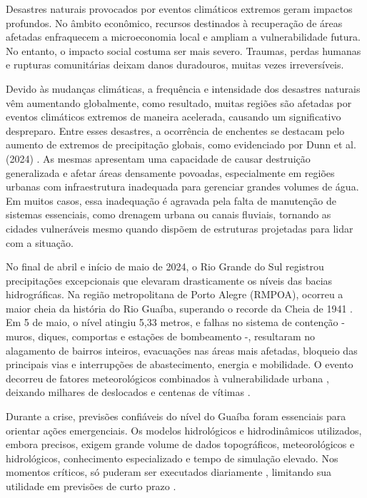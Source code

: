 Desastres naturais provocados por eventos climáticos extremos geram impactos profundos. No âmbito econômico, recursos
destinados à recuperação de áreas afetadas enfraquecem a microeconomia local e ampliam a vulnerabilidade futura. No
entanto, o impacto social costuma ser mais severo. Traumas, perdas humanas e rupturas comunitárias deixam danos
duradouros, muitas vezes irreversíveis.

Devido às mudanças climáticas, a frequência e intensidade dos desastres naturais vêm aumentando globalmente, como
resultado, muitas regiões são afetadas por eventos climáticos extremos de maneira acelerada, causando um significativo
despreparo. Entre esses desastres, a ocorrência de enchentes se destacam pelo aumento de extremos de precipitação
globais, como evidenciado por Dunn et al. (2024) \cite{dunn}. As mesmas apresentam uma capacidade de causar destruição
generalizada e afetar áreas densamente povoadas, especialmente em regiões urbanas com infraestrutura inadequada para
gerenciar grandes volumes de água. Em muitos casos, essa inadequação é agravada pela falta de manutenção de sistemas
essenciais, como drenagem urbana ou canais fluviais, tornando as cidades vulneráveis mesmo quando dispõem de estruturas
projetadas para lidar com a situação.

No final de abril e início de maio de 2024, o Rio Grande do Sul registrou precipitações excepcionais que elevaram
drasticamente os níveis das bacias hidrográficas. Na região metropolitana de Porto Alegre (RMPOA), ocorreu a maior cheia
da história do Rio Guaíba, superando o recorde da Cheia de 1941 \cite{dep}. Em 5 de maio, o nível atingiu 5{,}33 metros,
e falhas no sistema de contenção - muros, diques, comportas e estações de bombeamento \cite{comercio} -, resultaram no
alagamento de bairros inteiros, evacuações nas áreas mais afetadas, bloqueio das principais vias e interrupções de
abastecimento, energia e mobilidade. O evento decorreu de fatores meteorológicos combinados à vulnerabilidade urbana
\cite{yang, hammond, zhang, pereira}, deixando milhares de deslocados e centenas de vítimas \cite{alcantara}.

Durante a crise, previsões confiáveis do nível do Guaíba foram essenciais para orientar ações emergenciais. Os modelos
hidrológicos e hidrodinâmicos utilizados, embora precisos, exigem grande volume de dados topográficos, meteorológicos e
hidrológicos, conhecimento especializado e tempo de simulação elevado. Nos momentos críticos, só puderam ser executados
diariamente \cite{iph}, limitando sua utilidade em previsões de curto prazo \cite{atashi}.

